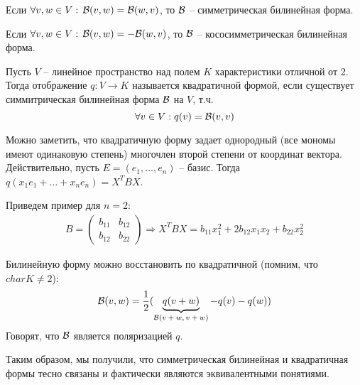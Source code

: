 \begin{conj}
    Если $\forall v, w \in V: \, \mathcal{B}(v, w) = \mathcal{B}(w, v)$, то 
    $\mathcal{B}$ -- симметрическая билинейная форма.
\end{conj}

\begin{conj}
    Если $\forall v, w \in V: \, \mathcal{B}(v, w) = -\mathcal{B}(w, v)$, то 
    $\mathcal{B}$ -- кососимметрическая билинейная форма.
\end{conj}

\begin{conj}
    Пусть $V$ -- линейное пространство над полем $K$ характеристики отличной от 2.
    Тогда отображение $q: V \to K$ называется квадратичной формой,
    если существует симмитрическая билинейная форма $\mathcal{B}$ на $V$, т.ч.
    \[ \forall v \in V: q(v) = \mathcal{B}(v, v) \]
\end{conj}

Можно заметить, что квадратичную форму задает однородный (все мономы имеют одинаковую степень) многочлен второй степени от координат вектора.
Действительно, пусть $E = (e_1, \dots, e_n)$ -- базис.
Тогда $q(x_1e_1 + \dots + x_ne_n) = X^TBX$.

Приведем пример для $n = 2$: \begin{gather*}
    B = \left(\begin{array}{cc}
        b_{11} & b_{12} \\ 
        b_{12} & b_{22}
        \end{array}\right) \Rightarrow X^TBX = b_{11}x^2_1 + 2b_{12}x_1x_2 + b_{22}x^2_2
\end{gather*}

Билинейную форму можно восстановить по квадратичной (помним, что $char K \neq 2$):
$$
    \mathcal{B}(v, w) = \frac{1}{2}(
        \underbrace{q(v + w)}_{\text{$\mathcal{B}(v + w, v + w)$}} - q(v) - q(w)
        )
$$
Говорят, что $\mathcal{B}$ является поляризацией $q$.

Таким образом, мы получили, что симметрическая билинейная и квадратичная формы тесно связаны и фактически являются эквивалентными понятиями.